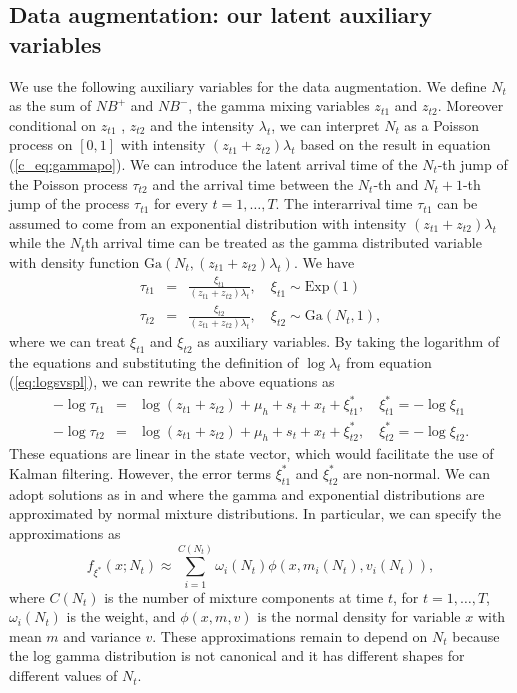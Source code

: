 \documentclass[12pt]{article}
\begin{document}
\subsection{Data augmentation: our latent auxiliary variables}

We use the following auxiliary variables for the data augmentation.
We define $N_t$ as the sum of $NB^{+}$ and $NB^{-}$,
the gamma mixing variables $z_{t1}$ and $z_{t2}$.
Moreover conditional on $z_{t1}$ , $z_{t2}$
and the intensity $\lambda_t$, we can interpret $N_t$ as a Poisson process on $[0,1]$ with intensity
$(z_{t1}+z_{t2})\lambda_t$ based on the result in equation
(\ref{c_eq:gammapo}). We can introduce the latent arrival
time of the $N_t$-th jump of the Poisson process $\tau_{t2}$ and
the arrival time between the $N_t$-th and $N_t+1$-th
jump of the process $\tau_{t1}$ for every $t=1, \ldots, T$.
The interarrival time $\tau_{t1}$ can be assumed to come from an
exponential distribution with intensity $(z_{t1}+z_{t2})\lambda_t$
while the $N_t$th arrival time can be treated as the gamma distributed variable
with density function 
$\text{Ga}(N_t, (z_{t1}+z_{t2})\lambda_t)$.
We have
\begin{eqnarray}
\tau_{t1} &=& \frac{\xi_{t1}}{(z_{t1}+z_{t2})\lambda_t}, \quad \xi_{t1} \sim \text{Exp}(1) \\
\tau_{t2} &=& \frac{\xi_{t2}}{(z_{t1}+z_{t2})\lambda_t},  \quad \xi_{t2} \sim \text{Ga}(N_t ,1),
\end{eqnarray}
where we can treat $\xi_{t1}$ and $\xi_{t2}$ as auxiliary variables.
By taking the logarithm of the equations and substituting
the definition of $\log \lambda_t$ from
equation (\ref{eq:logsvspl}), we can rewrite the above equations as 
\begin{eqnarray}
-\log \tau_{t1} &=& \log(z_{t1}+z_{t2})+ \mu_h + s_t +x_t  + \xi^{*}_{t1}, \quad \xi^{*}_{t1} =-\log \xi_{t1} \\
-\log \tau_{t2} &=&  \log(z_{t1}+z_{t2})+ \mu_h + s_t +x_t  + \xi^{*}_{t2}, \quad \xi^{*}_{t2} =-\log \xi_{t2}.
\end{eqnarray}
These equations are linear in the state vector, which would facilitate the use
of Kalman filtering. However, the error terms $\xi^{*}_{t1}$ and $\xi^{*}_{t2}$
are non-normal. We can adopt solutions as in \citet{SFSWagner2006}
and \citet{SFSFHeldRue2009} where the gamma and exponential distributions
are approximated by normal mixture distributions.
In particular, we can specify the approximations as
\begin{equation}
f_{\xi^{*}}(x; N_t)\approx \sum \limits_{i=1}^{C(N_t)} \omega_{i}(N_t) \phi\left(x, m_{i}(N_t),v_{i}(N_t)\right),
\end{equation}
where $C(N_t)$ is the number of mixture components at time $t$, for $t=1,\ldots,T$,
$\omega_{i}(N_t)$ is the weight, and $\phi(x,m,v)$ is the normal density
for variable $x$ with mean $m$ and variance $v$.
These approximations remain to depend on $N_t$ because
the log gamma distribution is not canonical and it has different shapes for different
values of $N_t$.
\end{document}
